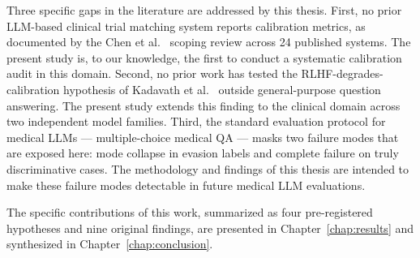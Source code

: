 Three specific gaps in the literature are addressed by this thesis. 
First, no prior LLM-based clinical trial matching system reports 
calibration metrics, as documented by the Chen et 
al.~\cite{chen2025scoping} scoping review across 24 published systems. 
The present study is, to our knowledge, the first to conduct a 
systematic calibration audit in this domain. Second, no prior work has 
tested the RLHF-degrades-calibration hypothesis of Kadavath et 
al.~\cite{kadavath2022know} outside general-purpose question answering. 
The present study extends this finding to the clinical domain across 
two independent model families. Third, the standard evaluation 
protocol for medical LLMs --- multiple-choice medical QA --- masks two 
failure modes that are exposed here: mode collapse in evasion labels 
and complete failure on truly discriminative cases. The methodology 
and findings of this thesis are intended to make these failure modes 
detectable in future medical LLM evaluations.

The specific contributions of this work, summarized as four 
pre-registered hypotheses and nine original findings, are presented in 
Chapter~\ref{chap:results} and synthesized in 
Chapter~\ref{chap:conclusion}.